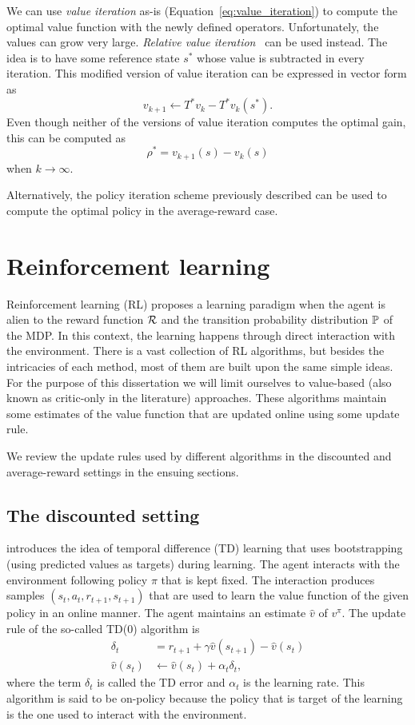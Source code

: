 We can use \textit{value iteration} as-is (Equation~\ref{eq:value_iteration}) to compute the optimal value function with the newly defined operators. Unfortunately, the values can grow very large. \textit{Relative value iteration}~\citep{White1963} can be used instead. The idea is to have some reference state $s^*$ whose value is subtracted in every iteration. This modified version of value iteration can be expressed in vector form as
\begin{equation}
    v_{k+1}\gets T^* v_k - T^* v_k(s^*).
\end{equation}
Even though neither of the versions of value iteration computes the optimal gain, this can be computed as 
\begin{equation*}
  \rho^*=v
_{k+1}(s) - v_k(s)
\end{equation*}  when $k\rightarrow\infty$.

Alternatively, the policy iteration scheme previously described can be used to compute the optimal policy in the average-reward case.

\section{Reinforcement learning}
Reinforcement learning (RL) proposes a learning paradigm when the agent is alien to the reward function $\mathcal{R}$ and the transition probability distribution $\mathbb{P}$ of the MDP. In this context, the learning happens through direct interaction with the environment. There is a vast collection of RL algorithms, but besides the intricacies of each method, most of them are built upon the same simple ideas. For the purpose of this dissertation we will limit ourselves to value-based (also known as critic-only in the literature) approaches. These algorithms maintain some estimates of the value function that are updated online using some update rule.

We review the update rules  used by different algorithms in the discounted and average-reward settings in the ensuing sections.

\subsection{The discounted setting}
\citet{Sutton1988} introduces the idea of temporal difference (TD) learning that uses bootstrapping (using predicted values as targets) during learning. The agent interacts with the environment following policy $\pi$ that is kept fixed. The interaction produces samples ${(s_t, a_t, r_{t+1}, s_{t+1})}$ that are used to learn the value function of the given policy in an online manner. The agent maintains an estimate $\widehat v$ of $v^\pi$. The update rule of the so-called TD($0$) algorithm is
\begin{align}
  \delta_t &= r_{t+1} + \gamma \widehat v(s_{t+1}) - \widehat v(s_t)\\  
  \widehat v(s_t) &\gets \widehat v(s_t) + \alpha_t \delta_t,
\end{align}
where the term $\delta_t$ is called the TD error and $\alpha_t$ is the learning rate. This algorithm is said to be on-policy because the policy that is target of the learning is the one used to interact with the environment. 

